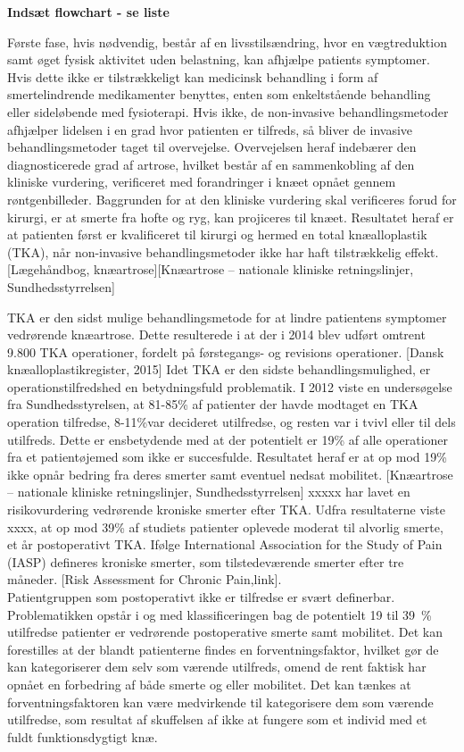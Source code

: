 \textbf{Indsæt flowchart - se liste}

Første fase, hvis nødvendig, består af en livsstilsændring, hvor en vægtreduktion samt øget fysisk aktivitet uden belastning, kan afhjælpe patients symptomer. Hvis dette ikke er tilstrækkeligt kan medicinsk behandling i form af smertelindrende medikamenter benyttes, enten som enkeltstående behandling eller sideløbende med fysioterapi. Hvis ikke, de non-invasive behandlingsmetoder afhjælper lidelsen i en grad hvor patienten er tilfreds, så bliver de invasive behandlingsmetoder taget til overvejelse. Overvejelsen heraf indebærer den diagnosticerede grad af artrose, hvilket består af en sammenkobling af den kliniske vurdering, verificeret med forandringer i knæet opnået gennem røntgenbilleder. Baggrunden for at den kliniske vurdering skal verificeres forud for kirurgi, er at smerte fra hofte og ryg, kan projiceres til knæet. Resultatet heraf er at patienten først er kvalificeret til kirurgi og hermed en total knæalloplastik (TKA), når non-invasive behandlingsmetoder ikke har haft tilstrækkelig effekt. [Lægehåndbog, knæartrose][Knæartrose – nationale kliniske retningslinjer, Sundhedsstyrrelsen]

TKA er den sidst mulige behandlingsmetode for at lindre patientens symptomer vedrørende knæartrose. Dette resulterede i at der i 2014 blev udført omtrent 9.800 TKA operationer, fordelt på førstegangs- og revisions operationer. [Dansk knæalloplastikregister, 2015] Idet TKA er den sidste behandlingsmulighed, er operationstilfredshed en betydningsfuld problematik. I 2012 viste en undersøgelse fra Sundhedsstyrelsen, at 81-85\% af patienter der havde modtaget en TKA operation tilfredse, 8-11\%var decideret utilfredse, og resten var i tvivl eller til dels utilfreds. Dette er ensbetydende med at der potentielt er 19\% af alle operationer fra et patientøjemed som ikke er succesfulde. Resultatet heraf er at op mod 19\% ikke opnår bedring fra deres smerter samt eventuel nedsat mobilitet. [Knæartrose – nationale kliniske retningslinjer, Sundhedsstyrrelsen] xxxxx har lavet en risikovurdering vedrørende kroniske smerter efter TKA. Udfra resultaterne viste xxxx, at op mod 39\% af studiets patienter oplevede moderat til alvorlig smerte, et år postoperativt TKA. Ifølge International Association for the Study of Pain (IASP) defineres kroniske smerter, som tilstedeværende smerter efter tre måneder. [Risk Assessment for Chronic Pain,link]. \\
Patientgruppen som postoperativt ikke er tilfredse er svært definerbar. Problematikken opstår i og med klassificeringen bag de potentielt 19 til 39~\% utilfredse patienter er vedrørende postoperative smerte samt mobilitet. Det kan forestilles at der blandt patienterne findes en forventningsfaktor, hvilket gør de kan kategoriserer dem selv som værende utilfreds, omend de rent faktisk har opnået en forbedring af både smerte og eller mobilitet. Det kan tænkes at forventningsfaktoren kan være medvirkende til kategorisere dem som værende utilfredse, som resultat af skuffelsen af ikke at fungere som et individ med et fuldt funktionsdygtigt knæ.  

